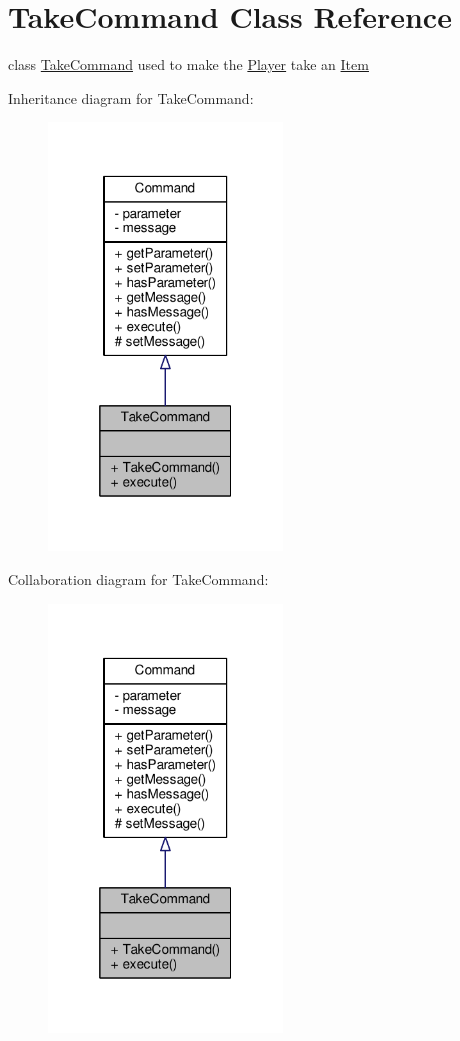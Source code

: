 \hypertarget{classTakeCommand}{\section{Take\-Command Class Reference}
\label{classTakeCommand}
}


class \hyperlink{classTakeCommand}{Take\-Command} used to make the \hyperlink{classPlayer}{Player} take an \hyperlink{classItem}{Item}  




Inheritance diagram for Take\-Command\-:
\nopagebreak
\begin{figure}[H]
\begin{center}
\leavevmode
\includegraphics[width=176pt]{classTakeCommand__inherit__graph}
\end{center}
\end{figure}


Collaboration diagram for Take\-Command\-:
\nopagebreak
\begin{figure}[H]
\begin{center}
\leavevmode
\includegraphics[width=176pt]{classTakeCommand__coll__graph}
\end{center}
\end{figure}
